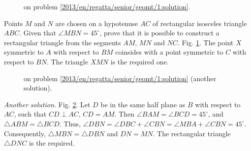\ifsolution
\begin{figure}\centering
    \caption{on problem \ref{2013/en/regatta/senior/geomt/1:solution}.}
    \label{2013/en/regatta/senior/geomt/1:solution:fig}
\end{figure}%
\fi %

\problem
Points $M$ and $N$ are chosen on a hypotenuse $AC$ of rectangular isosceles
triangle $ABC$.
Given that $\angle MBN = 45^\circ$, prove that it is possible to construct a
rectangular triangle from the segments $AM$, $MN$ and $NC$.
\solution
\label{2013/en/regatta/senior/geomt/1:solution}%
Fig. \ref{2013/en/regatta/senior/geomt/1:solution:fig}.
The point $X$ symmetric to $A$ with respect to $BM$ coinsides with a point
symmetric to $C$ with respect to $BN$.
The triangle $XMN$ is the required one.
\par
\begin{figure}\centering
    \caption{on problem \ref{2013/en/regatta/senior/geomt/1:solution}
        (another solution).}
    \label{2013/en/regatta/senior/geomt/1:solution:fig/another}
\end{figure}%
\emph{Another solution.}
Fig. \ref{2013/en/regatta/senior/geomt/1:solution:fig/another}.
Let $D$ be in the same half plane as $B$ with respect to $AC$, such that
$CD \perp AC$, $CD = AM$.
Then $\angle BAM = \angle BCD = 45^\circ$, and $\triangle ABM = \triangle BCD$.
Thus,
\(
    \angle DBN = \angle DBC + \angle CBN
=
    \angle MBA + \angle CBN = 45^\circ
\).
Consequently, $\triangle MBN = \triangle DBN$ and $DN = MN$.
The rectangular triangle $\triangle DNC$ is the required.
\endproblem
